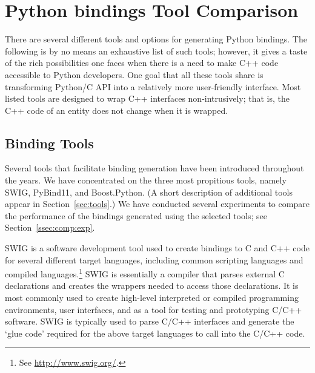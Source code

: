 \section{Python bindings Tool Comparison}
\label{sec:comp}
There are several different tools and options for generating Python bindings.  The following is by no means an exhaustive list of such tools; however, it gives a taste of the rich possibilities one faces when there is a need to make C++ code accessible to Python developers. One goal that all these tools share is transforming Python/C API into a relatively more user-friendly interface. Most listed tools are designed to wrap C++ interfaces non-intrusively; that is, the C++ code of an entity does not change when it is wrapped.

\subsection{Binding Tools}
\label{ssec:comp:tools}
Several tools that facilitate binding generation have been introduced throughout the years. We have concentrated on the three most propitious tools, namely SWIG, PyBind11, and Boost.Python. (A short description of additional tools appear in Section~\ref{sec:tools}.) We have conducted several experiments to compare the performance of the bindings generated using the selected tools; see Section~\ref{ssec:comp:exp}.

SWIG is a software development tool used to create bindings to C and C++ code for several different target languages, including common scripting languages and compiled languages.\footnote{See \url{http://www.swig.org/}.}
%
SWIG is essentially a compiler that parses external C declarations and creates the wrappers needed to access those declarations. It is most commonly used to create high-level interpreted or compiled programming environments, user interfaces, and as a tool for testing and prototyping C/C++ software. SWIG is typically used to parse C/C++ interfaces and generate the `glue code' required for the above target languages to call into the C/C++ code.

